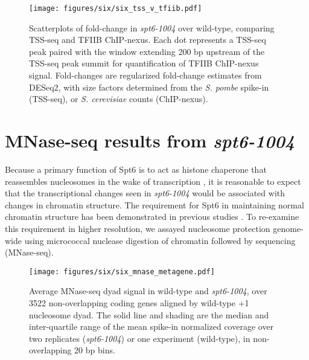 \begin{figure}
    \centering
    \texttt{[image: figures/six/six\_tss\_v\_tfiib.pdf]}
    \caption[Scatterplots of fold-change in \textit{spt6-1004} over wild-type, comparing TSS-seq and TFIIB ChIP-nexus.]{Scatterplots of fold-change in \textit{spt6-1004} over wild-type, comparing TSS-seq and TFIIB ChIP-nexus. Each dot represents a TSS-seq peak paired with the window extending 200 bp upstream of the TSS-seq peak summit for quantification of TFIIB ChIP-nexus signal. Fold-changes are regularized fold-change estimates from DESeq2, with size factors determined from the \textit{S. pombe} spike-in (TSS-seq), or \textit{S. cerevisiae} counts (ChIP-nexus).}
    \label{fig:six_tss_v_tfiib}
\end{figure}

\clearpage

\section{MNase-seq results from \textit{spt6-1004}}

Because a primary function of Spt6 is to act as histone chaperone that reassembles nucleosomes in the wake of transcription \citep{duina2011}, it is reasonable to expect that the transcriptional changes seen in \textit{spt6-1004} would be associated with changes in chromatin structure.
The requirement for Spt6 in maintaining normal chromatin structure has been demonstrated in previous studies \citep{bortvin1996, ivanovska2011, jeronimo2015, kaplan2003, perales2013, vanbakel2013, degennaro2013}.
To re-examine this requirement in higher resolution, we assayed nucleosome protection genome-wide using micrococcal nuclease digestion of chromatin followed by sequencing (MNase-seq).
\begin{figure}[h]
    \centering
    \texttt{[image: figures/six/six\_mnase\_metagene.pdf]}
    \caption[Average MNase-seq dyad signal in wild-type and \textit{spt6-1004}, over non-overlapping genes aligned by wild-type +1 nucleosome dyad.]{Average MNase-seq dyad signal in wild-type and \textit{spt6-1004}, over 3522 non-overlapping coding genes aligned by wild-type +1 nucleosome dyad. The solid line and shading are the median and inter-quartile range of the mean spike-in normalized coverage over two replicates (\textit{spt6-1004}) or one experiment (wild-type), in non-overlapping 20 bp bins.}
    \label{fig:six_mnase_metagene}
\end{figure}

